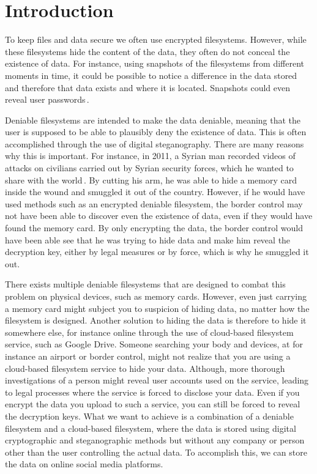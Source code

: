 
\chapter{Introduction}
\label{ch:introduction}

To keep files and data secure we often use encrypted filesystems. However, while these filesystems hide the content of the data, they often do not conceal the existence of data. For instance, using snapshots of the filesystems from different moments in time, it could be possible to notice a difference in the data stored and therefore that data exists and where it is located. Snapshots could even reveal user passwords\,\cite{hanMultiuserSteganographicFile2010}.

Deniable filesystems are intended to make the data deniable, meaning that the user is supposed to be able to plausibly deny the existence of data. This is often accomplished through the use of digital steganography. There are many reasons why this is important. For instance, in 2011, a Syrian man recorded videos of attacks on civilians carried out by Syrian security forces, which he wanted to share with the world\,\cite{westheadHowSyrianRefugee2012}. By cutting his arm, he was able to hide a memory card inside the wound and smuggled it out of the country. However, if he would have used methods such as an encrypted deniable filesystem, the border control may not have been able to discover even the existence of data, even if they would have found the memory card. By only encrypting the data, the border control would have been able see that he was trying to hide data and make him reveal the decryption key, either by legal measures or by force, which is why he smuggled it out.

There exists multiple deniable filesystems that are designed to combat this problem on physical devices, such as memory cards. However, even just carrying a memory card might subject you to suspicion of hiding data, no matter how the filesystem is designed. Another solution to hiding the data is therefore to hide it somewhere else, for instance online through the use of cloud-based filesystem service, such as Google Drive. Someone searching your body and devices, at for instance an airport or border control, might not realize that you are using a cloud-based filesystem service to hide your data. Although, more thorough investigations of a person might reveal user accounts used on the service, leading to legal processes where the service is forced to disclose your data. Even if you encrypt the data you upload to such a service, you can still be forced to reveal the decryption keys. What we want to achieve is a combination of a deniable filesystem and a cloud-based filesystem, where the data is stored using digital cryptographic and steganographic methods but without any company or person other than the user controlling the actual data. To accomplish this, we can store the data on online social media platforms.

